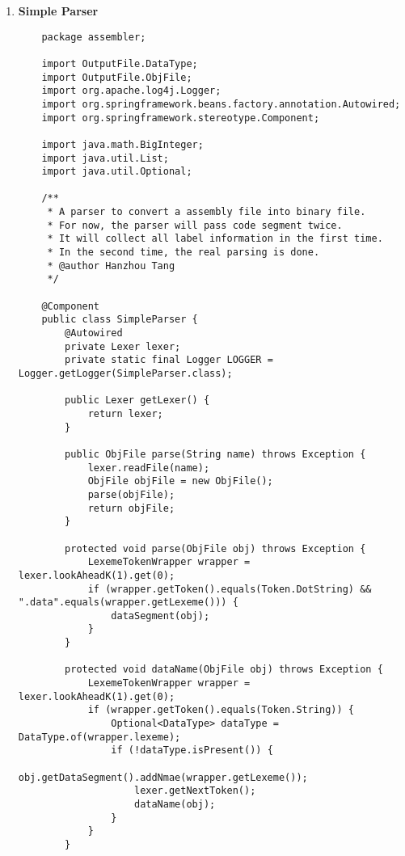 \documentclass[12pt]{extarticle}
\begin{document}
\begin{enumerate}
\begin{lstlisting}
    }
    \end{lstlisting}
    
    \item\textbf {Simple Parser} \\
    \begin{lstlisting}
    package assembler;
    
    import OutputFile.DataType;
    import OutputFile.ObjFile;
    import org.apache.log4j.Logger;
    import org.springframework.beans.factory.annotation.Autowired;
    import org.springframework.stereotype.Component;
    
    import java.math.BigInteger;
    import java.util.List;
    import java.util.Optional;
    
    /**
     * A parser to convert a assembly file into binary file.
     * For now, the parser will pass code segment twice.
     * It will collect all label information in the first time.
     * In the second time, the real parsing is done.
     * @author Hanzhou Tang
     */
    
    @Component
    public class SimpleParser {
        @Autowired
        private Lexer lexer;
        private static final Logger LOGGER = Logger.getLogger(SimpleParser.class);
    
        public Lexer getLexer() {
            return lexer;
        }
    
        public ObjFile parse(String name) throws Exception {
            lexer.readFile(name);
            ObjFile objFile = new ObjFile();
            parse(objFile);
            return objFile;
        }
    
        protected void parse(ObjFile obj) throws Exception {
            LexemeTokenWrapper wrapper = lexer.lookAheadK(1).get(0);
            if (wrapper.getToken().equals(Token.DotString) && ".data".equals(wrapper.getLexeme())) {
                dataSegment(obj);
            }
        }
    
        protected void dataName(ObjFile obj) throws Exception {
            LexemeTokenWrapper wrapper = lexer.lookAheadK(1).get(0);
            if (wrapper.getToken().equals(Token.String)) {
                Optional<DataType> dataType = DataType.of(wrapper.lexeme);
                if (!dataType.isPresent()) {
                    obj.getDataSegment().addNmae(wrapper.getLexeme());
                    lexer.getNextToken();
                    dataName(obj);
                }
            }
        }
    

\end{lstlisting}
\end{enumerate}
\end{document}
